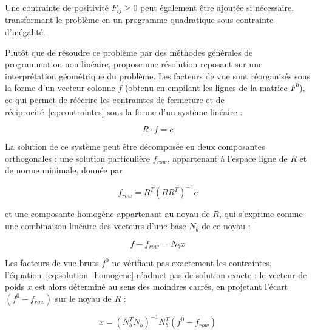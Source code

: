 Une contrainte de positivité $F_{ij} \geq 0$ peut également être ajoutée si nécessaire, transformant le problème en un programme quadratique sous contrainte d'inégalité.

Plutôt que de résoudre ce problème par des méthodes générales de programmation non linéaire, \cite{renforcement95} propose une résolution reposant sur une interprétation géométrique du problème. Les facteurs de vue sont réorganisés sous la forme d'un vecteur colonne $f$ (obtenu en empilant les lignes de la matrice $F^0$), ce qui permet de réécrire les contraintes de fermeture et de réciprocité~\ref{eq:contraintes} sous la forme d'un système linéaire :

\begin{equation}
    R \cdot f = c
    \label{eq:systeme_contraintes}
\end{equation}

La solution de ce système peut être décomposée en deux composantes orthogonales : une solution particulière $f_{row}$, appartenant à l'espace ligne de $R$ et de norme minimale, donnée par

\begin{equation}
    f_{row} = R^T (R R^T)^{-1} c
    \label{eq:solution_particuliere}
\end{equation}

et une composante homogène appartenant au noyau de $R$, qui s'exprime comme une combinaison linéaire des vecteurs d'une base $N_b$ de ce noyau :

\begin{equation}
    f - f_{row} = N_b x
    \label{eq:solution_homogene}
\end{equation}

Les facteurs de vue bruts $f^0$ ne vérifiant pas exactement les contraintes, l'équation~\eqref{eq:solution_homogene} n'admet pas de solution exacte : le vecteur de poids $x$ est alors déterminé au sens des moindres carrés, en projetant l'écart $(f^0 - f_{row})$ sur le noyau de $R$ :

\begin{equation}
    x = (N_b^T N_b)^{-1} N_b^T (f^0 - f_{row})
    \label{eq:solution_x}
\end{equation}

